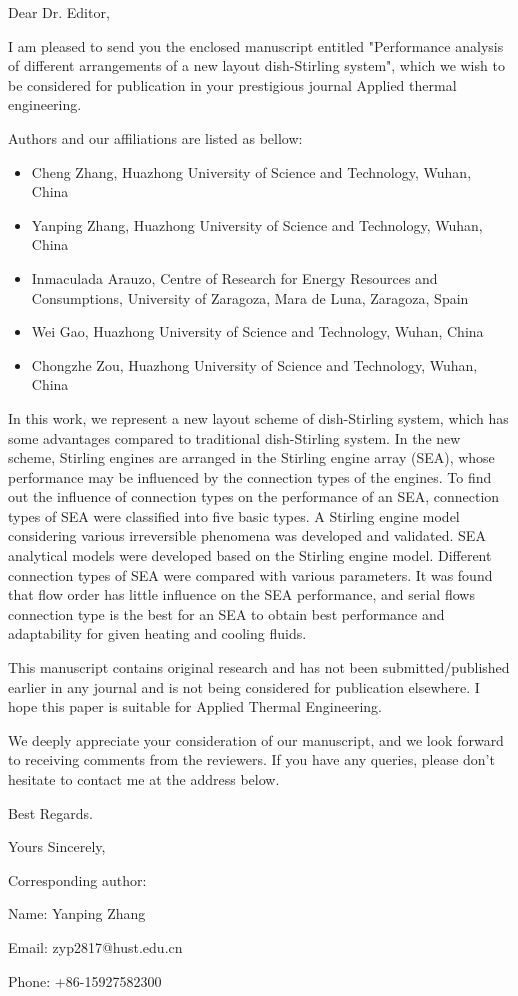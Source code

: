 \documentclass[12pt]{letter}
\begin{document}
Dear Dr. Editor,

I am pleased to send you the enclosed manuscript entitled "Performance analysis of different arrangements of a new layout dish-Stirling system", which we wish to be considered for publication in your prestigious journal Applied thermal engineering.

Authors and our affiliations are listed as bellow:

\begin{itemize}
  \item Cheng Zhang, Huazhong University of Science and Technology, Wuhan, China

  \item Yanping Zhang, Huazhong University of Science and Technology, Wuhan, China
  
  \item Inmaculada Arauzo, Centre of Research for Energy Resources and Consumptions, University of Zaragoza, Mara de Luna, Zaragoza, Spain
  
  \item Wei Gao, Huazhong University of Science and Technology, Wuhan, China
  
  \item Chongzhe Zou, Huazhong University of Science and Technology, Wuhan, China

\end{itemize}

In this work, we represent a new layout scheme of dish-Stirling system, which has some advantages compared to traditional dish-Stirling system. In the new scheme, Stirling engines are arranged in the Stirling engine array (SEA), whose performance may be influenced by the connection types of the engines. To find out the influence of connection types on the performance of an SEA, connection types of SEA were classified into five basic types. A Stirling engine model considering various irreversible phenomena was developed and validated. SEA analytical models were developed based on the Stirling engine model. Different connection types of SEA were compared with various parameters. It was found that flow order has little influence on the SEA performance, and serial flows connection type is the best for an SEA to obtain best performance and adaptability for given heating and cooling fluids.

This manuscript contains original research and has not been submitted/published earlier in any journal and is not being considered for publication elsewhere. I hope this paper is suitable for Applied Thermal Engineering.

We deeply appreciate your consideration of our manuscript, and we look forward to receiving comments from the reviewers. If you have any queries, please don't hesitate to contact me at the address below.

Best Regards.

Yours Sincerely,

Corresponding author:

Name: Yanping Zhang

Email: zyp2817@hust.edu.cn

Phone: +86-15927582300
\end{document}
